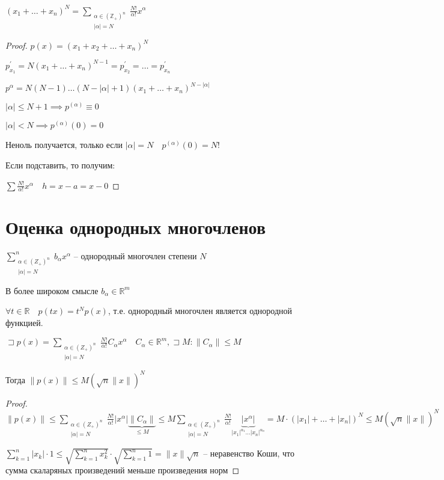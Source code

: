 \documentclass{book}
\newcommand\R{\ensuremath{\mathbb{R}}}
\newcommand\Z{\ensuremath{\mathbb{Z}}}
\newcommand{\p}[1]{#1^{\prime}}
\theoremstyle{definition}
\begin{document}
    $\left( x_1 + \ldots + x_{n}  \right) ^N = \sum_{\substack{\alpha\in \left( \Z _+ \right) ^n\\ |\alpha| = N}} \frac{N!}{\alpha!}x^{\alpha}$
    \begin{proof}
        $p(x) = \left( x_1 + x_2 + \ldots + x_{n}  \right) ^N$

        $\p p_{x_1} = N\left( x_1 + \ldots + x_{n}  \right) ^{N-1} = \p p_{x_2} = \ldots = \p p_{x_{n} }$

        $p^{\alpha} = N(N-1) \ldots \left( N - |\alpha|+1 \right)\left( x_1+\ldots+x_{n}  \right) ^{N - |\alpha|} $

        $|\alpha|\leqslant N+1 \implies p^{(\alpha)} \equiv 0$

        $|\alpha|<N \implies p^{(\alpha)}(0) = 0$

        Неноль получается, только если $|\alpha| = N\quad p^{(\alpha)}(0) = N!$

        Если подставить, то получим:

        $\sum \frac{N!}{\alpha!}x^{\alpha}\quad h = x-a = x-0$
    \end{proof}
    \section{Оценка однородных многочленов}
    \begin{definition}
        $\sum_{\substack{\alpha\in \left( Z_+ \right) ^n \\ |\alpha|=N}}^{n} b_{\alpha}x^{\alpha}$ -- однородный многочлен степени $N$

        В более широком смысле $b_{\alpha}\in \R^m$
    \end{definition}


    $\forall t\in \R\quad p\left( tx \right)  = t^Np(x)$, т.е. однородный многочлен является однородной функцией.

    \begin{statement}
        $\sqsupset p(x) = \sum_{\substack{\alpha\in \left( Z_+ \right) ^n \\ |\alpha|=N}} \frac{N!}{\alpha!}C_{\alpha}x^{\alpha}\quad C_{\alpha}\in \R^m, \sqsupset M: \|C_{\alpha}\|\leqslant M$

        Тогда $\|p(x)\|\leqslant M\left( \sqrt{n} \|x\| \right) ^N$
    \end{statement}
    \begin{proof}
        $\|p(x)\|\leqslant \sum_{\substack{\alpha\in \left( Z_+ \right) ^n \\ |\alpha|=N}}\frac{N!}{\alpha!} |x^{\alpha}|\underbrace{\|C_{\alpha}\|}_{\leqslant M}\leqslant M \sum_{\substack{\alpha\in \left( Z_+ \right) ^n \\ |\alpha|=N}}\frac{N!}{\alpha!}\underbrace{|x^{\alpha}|}_{|x_1|^{\alpha_1} \ldots |x_{n} |^{\alpha_n}} = M \cdot  \left( |x_1| + \ldots + |x_{n} | \right) ^{N}\leqslant M\left( \sqrt{n} \|x\| \right) ^N$

            $\sum_{k=1}^{n} |x_k|\cdot 1 \leqslant \sqrt{\sum_{k=1}^{n} x_k^2} \cdot \sqrt{\sum_{k=1}^{n} 1} = \|x\| \sqrt{n}  $ -- неравенство Коши, что сумма скаларяных произведений меньше произведения норм
    \end{proof}
\end{document}
